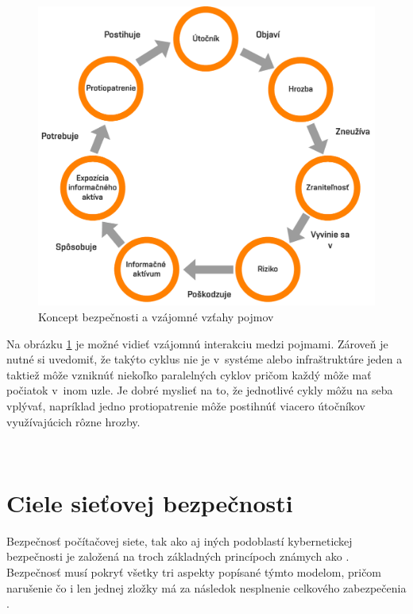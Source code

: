 	\begin{figure}[!h]
	\begin{center}
		\includegraphics[scale=0.5]{obrazky/sec_cycle.pdf}
	\end{center}
	\caption[Koncept bezpečnosti a vzájomné vzťahy pojmov]{Koncept bezpečnosti a vzájomné vzťahy pojmov \cite{McMillan2018}}
	\label{sec-cycle}
	\end{figure}

Na obrázku \ref{sec-cycle} je možné vidieť vzájomnú interakciu medzi pojmami. Zároveň je nutné si uvedomiť, že takýto cyklus nie je v~systéme alebo infraštruktúre jeden a taktiež môže vzniknúť niekoľko paralelných cyklov pričom každý môže mať počiatok v~inom uzle. Je dobré myslieť na to, že jednotlivé cykly môžu na seba vplývať, napríklad jedno protiopatrenie môže postihnúť viacero útočníkov využívajúcich rôzne hrozby. 

\


\section{Ciele sieťovej bezpečnosti}
Bezpečnosť počítačovej siete, tak ako aj iných podoblastí kybernetickej bezpečnosti je založená na troch základných princípoch známych ako . Bezpečnosť musí pokryť všetky tri aspekty popísané týmto modelom, pričom narušenie čo i len jednej zložky má za následok nesplnenie celkového zabezpečenia \cite{Vyncke2008}. 

